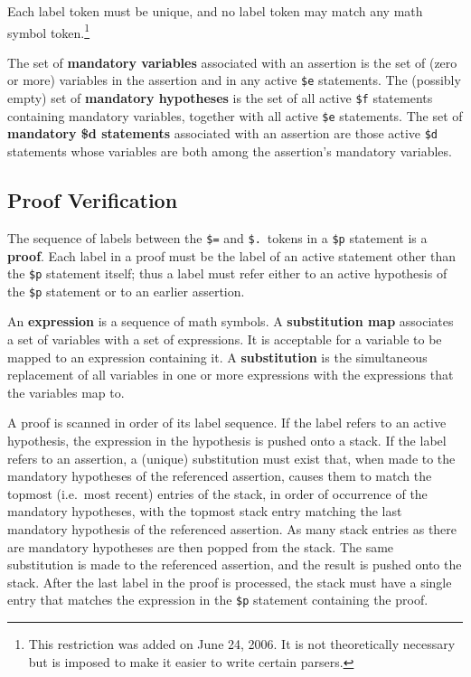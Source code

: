 Each label token must be unique, and
no label token may match any math symbol
token.\label{namespace}\footnote{This
restriction was added on June 24, 2006.
It is not theoretically necessary but is imposed to make it easier to
write certain parsers.}

The set of {\bf mandatory variables} associated with
an assertion is the set of (zero or more) variables in the assertion and in any
active \texttt{\$e} statements.  The (possibly empty) set of {\bf mandatory
hypotheses} is the set of all active \texttt{\$f}
statements containing mandatory variables, together with all active \texttt{\$e}
statements.
The set of {\bf mandatory {\bf \$d} statements} associated with an assertion are those active
\texttt{\$d} statements whose variables are both among the assertion's
mandatory variables.

\subsection{Proof Verification}\label{spec4}

The sequence of labels between the \texttt{\$=} and \texttt{\$.}\ tokens
in a \texttt{\$p} statement is a {\bf proof}. Each
label in a proof must be the label of an active statement other than the
\texttt{\$p} statement itself; thus a label must refer either to an
active hypothesis of the \texttt{\$p} statement or to an earlier
assertion.

An {\bf expression} is a sequence of math symbols. A {\bf
substitution map} associates a set of variables with a
set of expressions.  It is acceptable for a variable to be mapped to an
expression containing it.  A {\bf
substitution} is the
simultaneous replacement of all variables in one or more expressions with the
expressions that the variables map to.

A proof is scanned in order of its label sequence.  If the label refers to an
active hypothesis, the expression in the hypothesis is pushed onto a
stack.  If the label refers to an assertion, a
(unique) substitution must exist that, when made to the mandatory hypotheses
of the referenced assertion, causes them to match the topmost (i.e.\ most
recent) entries of the stack, in order of occurrence of the mandatory
hypotheses, with the topmost stack entry matching the last mandatory
hypothesis of the referenced assertion.  As many stack entries as there are
mandatory hypotheses are then popped from the stack.  The same substitution is
made to the referenced assertion, and the result is pushed onto the stack.
After the last label in the proof is processed, the stack must have a single
entry that matches the expression in the \texttt{\$p} statement containing the
proof.

